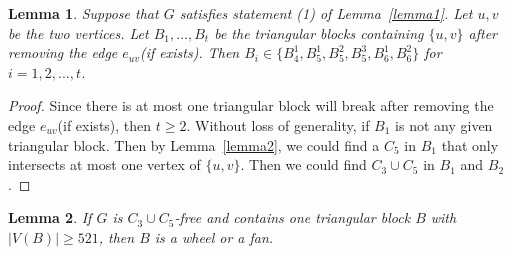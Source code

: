 \documentclass[12pt]{article}
\newtheorem{lemma}{Lemma}[section]
\begin{document}
\begin{lemma}\label{lemma3}
    Suppose that $G$ satisfies statement (1) of Lemma~\ref{lemma1}. Let $u,v$ be the two vertices. Let $B_1,\ldots,B_t$ be the triangular blocks containing $\{u,v\}$ after removing the edge $e_{uv}$(if exists). Then $B_i\in\{B_4^1,B_5^1,B_5^2,B_5^3,B_6^1,B_6^2\}$ for $i=1,2,...,t$.
\end{lemma}

\begin{proof}
    Since there is at most one triangular block will break after removing the edge $e_{uv}$(if exists), then $t\geq 2$. Without loss of generality, if $B_1$ is not any given triangular block. Then by Lemma~\ref{lemma2}, we could find a $C_5$ in $B_1$ that only intersects at most one vertex of $\{ u, v \}$. Then we could find $C_3\cup C_5$ in $B_1$ and $B_2$.
\end{proof}


\begin{lemma}\label{lemma4}
    If $G$ is $C_3\cup C_5$-free and contains one triangular block $B$ with $|V(B)|\geq 521$, then $B$ is a wheel or a fan.
\end{lemma}
\end{document}
